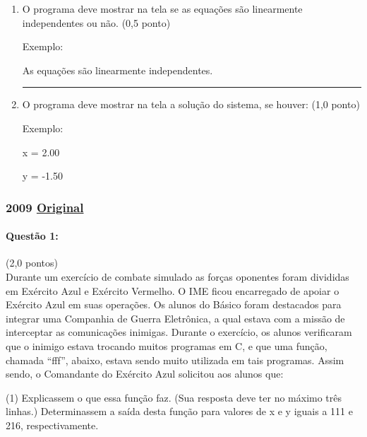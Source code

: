 \documentclass[12pt,a4paper]{article}
\newcommand{\original}[1]{\tiny \href{#1}{Original} \normalsize}
\begin{document}
\begin{enumerate}[label=\arabic*.]
a*x + b*y = m

c*x + d*y = n

Exemplo:

1.00*x-4.00*y=8.00

3.00*x+4.00*y=0.00

\rule{16cm}{0.01cm}

\item O programa deve mostrar na tela se as equações são linearmente independentes ou não. (0,5 ponto)

Exemplo:

As equações são linearmente independentes.

\rule{16cm}{0.01cm}

\item O programa deve mostrar na tela a solução do sistema, se houver: (1,0 ponto)

Exemplo:

x = 2.00

y = -1.50

\end{enumerate}

\newpage
\subsubsection{2009 \original{https://drive.google.com/file/d/18u7tsv8qBYGjGvuOF-52TcH-SkMpRu2q/view?usp=sharing}}


\paragraph{Questão 1:}(2,0 pontos)\\
Durante um exercício de combate simulado as forças oponentes foram divididas em Exército Azul e Exército Vermelho. O IME ficou encarregado de apoiar o Exército Azul em suas operações. Os alunos do Básico foram destacados para integrar uma Companhia de Guerra Eletrônica, a qual estava com a missão de interceptar as comunicações inimigas. Durante o exercício, os alunos verificaram que o inimigo estava trocando muitos programas em C, e que uma função, chamada “fff”, abaixo, estava sendo muito utilizada em tais programas.  Assim sendo, o Comandante do Exército Azul solicitou aos alunos que:
\begin{tasks}(1)
\task Explicassem o que essa função faz. (Sua resposta deve ter no máximo três linhas.)
\task Determinassem a saída desta função para valores de x e y iguais a 111 e 216, respectivamente.
\end{tasks}
\end{document}
